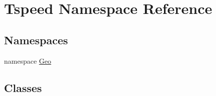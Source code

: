 \hypertarget{namespaceTspeed}{\section{Tspeed Namespace Reference}
\label{namespaceTspeed}
}
\subsection*{Namespaces}
\begin{DoxyCompactItemize}
\item 
namespace \hyperlink{namespaceTspeed_1_1Geo}{Geo}
\end{DoxyCompactItemize}
\subsection*{Classes}
